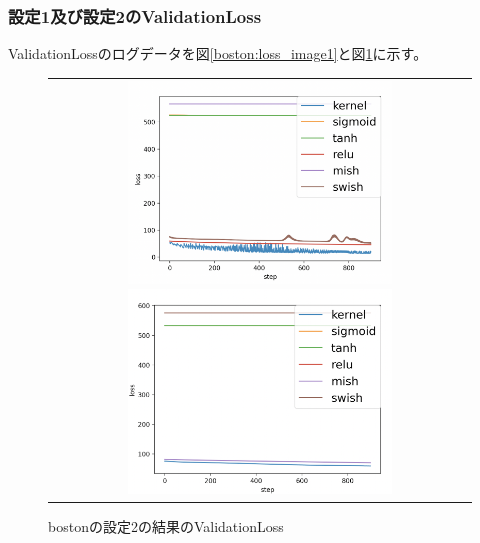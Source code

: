 \subsubsection{設定1及び設定2のValidationLoss}
\label{boston:loss}

ValidationLossのログデータを図\ref{boston:loss_image1}と図\ref{boston:loss_image2}に示す。

\begin{figure}[hbtp]
    \begin{center}
        \begin{tabular}{c}
            \begin{minipage}{0.5\hsize}
                \includegraphics[clip, width=7cm]{asset/boston_0.00001_1000_3_005_sgd_non_kaiming_uniform.png}
                    \caption{bostonの設定1の結果のValidationLoss}
                    \label{boston:loss_image1}
                    
            \end{minipage}
            \hspace{10pt}
            \begin{minipage}{0.5\hsize}
                \includegraphics[clip, width=7cm]{asset/boston_0.00001_1000_3_005_sgd_non_xavier_uniform.png}
                    \caption{bostonの設定2の結果のValidationLoss}
                    \label{boston:loss_image2}
            \end{minipage}
        \end{tabular}
    \end{center}
\end{figure}


